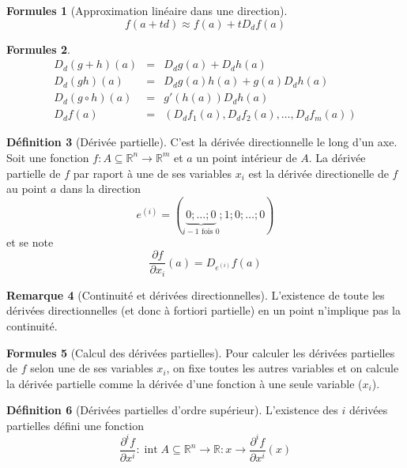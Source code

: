 \documentclass[11pt,a4paper]{article}
\theoremstyle{definition}
\newtheorem{mydef}{Définition}%
\newtheorem{myrem}[mydef]{Remarque}
\newtheorem{myform}[mydef]{Formules}
\DeclareMathOperator{\newint}{int}
\newcommand{\pa}{\partial}
\newcommand{\R}{\mathbb{R}}
\begin{document}
\begin{myform}[Approximation linéaire dans une direction]
	\[ f(a+td) \approx f(a) + t D_df(a) \]
\end{myform}

\begin{myform}
	\begin{eqnarray*}
		D_d(g+h)(a) &=& D_dg(a) + D_d h(a)\\
		D_d(gh)(a) &=& D_dg(a)h(a) + g(a)D_dh(a)\\
		D_d(g\circ h)(a) &=& g'(h(a))D_dh(a)\\
		D_df(a) &=& (D_df_1(a), D_df_2(a), \dots, D_df_m(a))
	\end{eqnarray*}
\end{myform}

\begin{mydef}[Dérivée partielle]
	C'est la dérivée directionnelle le long d'un axe.
	Soit une fonction $f : A\subseteq \R^n \to \R^m$ et $a$ un point intérieur de $A$. La dérivée partielle de $f$ par raport à une de ses variables $x_i$ est la dérivée directionelle de $f$ au point $a$ dans la direction
	\[ e^{(i)} = (\underbrace{0; \dots; 0}_{i-1\text{ fois }0}; 1; 0; \dots; 0) \]
	et se note
	\[ \frac{\pa f}{\pa x_i}(a) = D_{e^{(i)}} f(a) \]
\end{mydef}

\begin{myrem}[Continuité et dérivées directionnelles]
	L'existence de toute les dérivées directionnelles (et donc à fortiori partielle) en un point n'implique pas la continuité.
\end{myrem}

\begin{myform}[Calcul des dérivées partielles] Pour calculer les dérivées partielles de $f$ selon une de ses variables $x_i$, on fixe toutes les autres variables et on calcule la dérivée partielle comme la dérivée d'une fonction à une seule variable ($x_i$).
\end{myform}

\begin{mydef}[Dérivées partielles d'ordre supérieur]
	L'existence des $i$\ieme{} dérivées partielles défini une fonction
	\[ \frac{\pa^i f}{\pa x^i} : \newint A \subseteq \R^n \to \R : x \to \frac{\pa^i f}{\pa x^i}(x) \]
\end{mydef}

\end{document}
